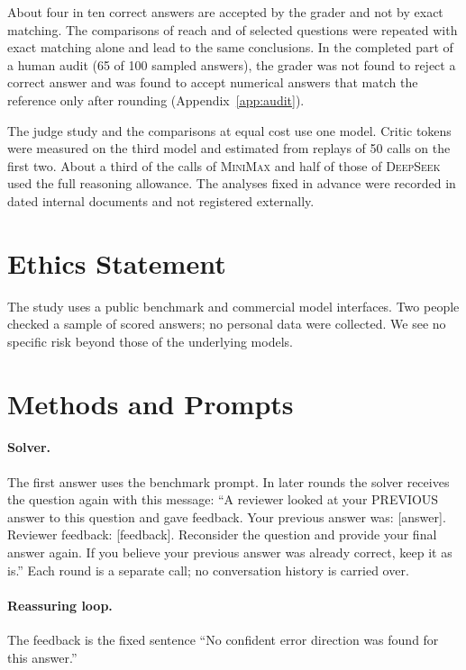 \documentclass[11pt]{article}
\newcommand{\ds}{\textsc{DeepSeek}}
\newcommand{\mm}{\textsc{MiniMax}}
\begin{document}
About four in ten correct answers are accepted by the grader and not by exact matching.
The comparisons of reach and of selected questions were repeated with exact matching alone and lead to the same conclusions.
In the completed part of a human audit (65 of 100 sampled answers), the grader was not found to reject a correct answer and was found to accept numerical answers that match the reference only after rounding (Appendix~\ref{app:audit}).

The judge study and the comparisons at equal cost use one model.
Critic tokens were measured on the third model and estimated from replays of 50 calls on the first two.
About a third of the calls of \mm{} and half of those of \ds{} used the full reasoning allowance.
The analyses fixed in advance were recorded in dated internal documents and not registered externally.

\section*{Ethics Statement}

The study uses a public benchmark and commercial model interfaces.
Two people checked a sample of scored answers; no personal data were collected.
We see no specific risk beyond those of the underlying models.



\appendix

\section{Methods and Prompts}
\label{app:prompts}

\paragraph{Solver.}
The first answer uses the benchmark prompt.
In later rounds the solver receives the question again with this message: ``A reviewer looked at your PREVIOUS answer to this question and gave feedback. Your previous answer was: [answer]. Reviewer feedback: [feedback]. Reconsider the question and provide your final answer again. If you believe your previous answer was already correct, keep it as is.''
Each round is a separate call; no conversation history is carried over.

\paragraph{Reassuring loop.}
The feedback is the fixed sentence ``No confident error direction was found for this answer.''
\end{document}
